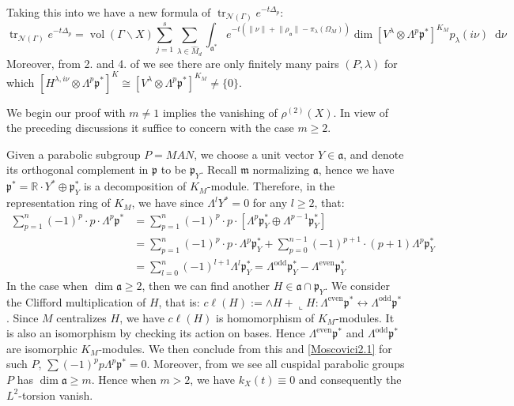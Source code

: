 \documentclass[11pt]{report}
\theoremstyle{definition}
\theoremstyle{plain}
\DeclareMathOperator{\tr}{tr}
\DeclareMathOperator{\vol}{vol}
\newcommand{\real}{\mathbb{R}}
\newcommand{\vna}{\mathcal{N}}
\newcommand{\even}{\mathrm{even}}
\newcommand{\odd}{\mathrm{odd}}
\renewcommand{\hat}{\widehat}
\newcommand{\norm}[1]{\lVert #1 \rVert}
\newcommand{\mass}[1]{\mathop{}\mathrm{d}{#1}}
\newcommand{\Lie}[1]{\mathfrak{#1}}
\begin{document}
Taking this into  we have a new formula of $\tr_{\vna(\Gamma)}e^{-t\Delta_p}$:
\begin{equation}\label{olbrich8}
\tr_{\vna(\Gamma)}e^{-t\Delta_p}=\vol(\Gamma\backslash X) \sum_{j=1}^s\sum_{\lambda\in \hat{M}_d}\int_{\Lie{a}^*}e^{-t(\norm{\nu}+\norm{\rho_{\Lie{a}}}-\pi_\lambda(\Omega_M))}\dim[V^\lambda\otimes \Lambda^p\Lie{p}^*]^{K_M}p_\lambda(i\nu)\mass{\nu}
\end{equation}
Moreover, from 2. and 4. of  we see there are only finitely many pairs $(P, \lambda)$ for which $[H^{\lambda, i\nu}\otimes \Lambda^p\Lie{p}^*]^K\cong [V^\lambda\otimes \Lambda^p\Lie{p}^*]^{K_M}\neq \{0\}$.

\bigskip

We begin our proof with $m\neq 1$ implies the vanishing of $\rho^{(2)}(X)$. In view of the preceding discussions it suffice to concern with the case $m\geq 2$. 
\par Given a parabolic subgroup $P=MAN$,  we choose a unit vector $Y\in \Lie{a}$, and denote its orthogonal complement in $\Lie{p}$ to be $\Lie{p}_Y$. Recall $\Lie{m}$ normalizing $\Lie{a}$, hence we have $\Lie{p}^*=\real\cdot Y^*\oplus \Lie{p}^*_Y $ is a decomposition of $K_M$-module. Therefore, in the representation ring of $K_M$, we have since $\Lambda^l Y^*=0$ for any $l\geq 2$, that:
\begin{equation}\label{Moscovici2.1}
\begin{split}
\sum^{n}_{p=1}(-1)^p\cdot p\cdot \Lambda^p\Lie{p}^* &= \sum_{p=1}^n(-1)^p\cdot p\cdot [\Lambda^p\Lie{p}^*_Y\oplus \Lambda^{p-1}\Lie{p}^*_Y]\\
&=\sum^n_{p=1}(-1)^p\cdot p\cdot \Lambda^p\Lie{p}^*_Y+\sum^{n-1}_{p=0}(-1)^{p+1}\cdot (p+1) \Lambda^{p}\Lie{p}^*_Y\\
&=\sum^{n}_{l=0}(-1)^{l+1}\Lambda^l\Lie{p}_Y^*=\Lambda^\odd\Lie{p}_Y^*-\Lambda^\even\Lie{p}^*_Y
\end{split}
\end{equation}
In the case when $\dim \Lie{a}\geq 2$, then we can find another $H\in \Lie{a}\cap \Lie{p}_Y$. We consider the Clifford multiplication of $H$, that is: $c\ell(H):=\wedge H+ \llcorner H:\Lambda^\even \Lie{p}^*\leftrightarrow \Lambda^\odd\Lie{p}^*$. Since $M$ centralizes $H$, we have $c\ell(H)$ is homomorphism of $K_M$-modules. It is also an isomorphism by checking its action on bases. Hence $\Lambda^\even\Lie{p}^*$ and $\Lambda^\odd \Lie{p}^*$ are isomorphic $K_M$-modules. We then conclude from this and \ref{Moscovici2.1} for such $P$, $\sum(-1)^pp\Lambda^p\Lie{p}^*=0$. Moreover, from  we see all cuspidal parabolic groups $P$ has $\dim \Lie{a}\geq m$. Hence when $m>2$, we have $k_X(t)\equiv 0$ and consequently the $L^2$-torsion vanish.
\end{document}
